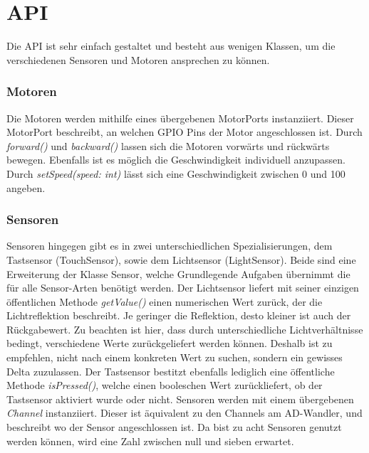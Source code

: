 \section{API}

Die API ist sehr einfach gestaltet und besteht aus wenigen Klassen, um die verschiedenen Sensoren und Motoren ansprechen zu können. 


\clearpage %

\subsubsection{Motoren}
Die Motoren werden mithilfe eines übergebenen MotorPorts instanziiert. Dieser MotorPort beschreibt, an welchen GPIO Pins der Motor angeschlossen ist. Durch \emph{forward()} und \emph{backward()} lassen sich die Motoren vorwärts und rückwärts bewegen. Ebenfalls ist es möglich die Geschwindigkeit individuell anzupassen. Durch \emph{setSpeed(speed: int)} lässt sich eine Geschwindigkeit zwischen 0 und 100 angeben. 

\subsubsection{Sensoren}
Sensoren hingegen gibt es in zwei unterschiedlichen Spezialisierungen, dem Tastsensor (TouchSensor), sowie dem Lichtsensor (LightSensor). Beide sind eine Erweiterung der Klasse Sensor, welche Grundlegende Aufgaben übernimmt die für alle Sensor-Arten benötigt werden. Der Lichtsensor liefert mit seiner einzigen öffentlichen Methode \emph{getValue()} einen numerischen Wert zurück, der die Lichtreflektion beschreibt. Je geringer die Reflektion, desto kleiner ist auch der Rückgabewert. Zu beachten ist hier, dass durch unterschiedliche Lichtverhältnisse bedingt, verschiedene Werte zurückgeliefert werden können. Deshalb ist zu empfehlen, nicht nach einem konkreten Wert zu suchen, sondern ein gewisses Delta zuzulassen. Der Tastsensor bestitzt ebenfalls lediglich eine öffentliche Methode \emph{isPressed()}, welche einen booleschen Wert zurückliefert, ob der Tastsensor aktiviert wurde oder nicht. Sensoren werden mit einem übergebenen \emph{Channel} instanziiert. Dieser ist äquivalent zu den Channels am AD-Wandler, und beschreibt wo der Sensor angeschlossen ist. Da bist zu acht Sensoren genutzt werden können, wird eine Zahl zwischen null und sieben erwartet.

